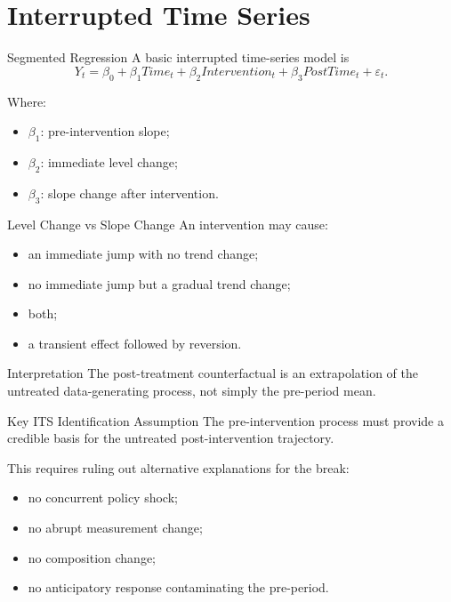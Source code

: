 \documentclass[aspectratio=169,11pt]{beamer}
\begin{document}
\section{Interrupted Time Series}

\begin{frame}{Segmented Regression}
A basic interrupted time-series model is
\[
Y_t
=
\beta_0
+
\beta_1 Time_t
+
\beta_2 Intervention_t
+
\beta_3 PostTime_t
+
\varepsilon_t.
\]

Where:
\begin{itemize}
\item \(\beta_1\): pre-intervention slope;
\item \(\beta_2\): immediate level change;
\item \(\beta_3\): slope change after intervention.
\end{itemize}
\end{frame}

\begin{frame}{Level Change vs Slope Change}
An intervention may cause:
\begin{itemize}
\item an immediate jump with no trend change;
\item no immediate jump but a gradual trend change;
\item both;
\item a transient effect followed by reversion.
\end{itemize}

\begin{block}{Interpretation}
The post-treatment counterfactual is an extrapolation of the untreated data-generating process, not simply the pre-period mean.
\end{block}
\end{frame}

\begin{frame}{Key ITS Identification Assumption}
The pre-intervention process must provide a credible basis for the untreated post-intervention trajectory.

This requires ruling out alternative explanations for the break:
\begin{itemize}
\item no concurrent policy shock;
\item no abrupt measurement change;
\item no composition change;
\item no anticipatory response contaminating the pre-period.
\end{itemize}
\end{frame}
\end{document}
